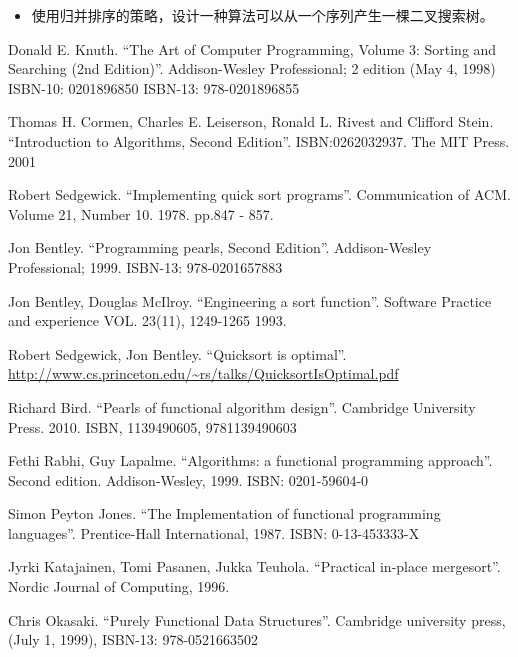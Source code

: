 \documentclass{ctexart}
\begin{document}
\begin{Exercise}
  \begin{itemize}
    \item 使用归并排序的策略，设计一种算法可以从一个序列产生一棵二叉搜索树。
  \end{itemize}
\end{Exercise}

\ifx\wholebook\relax\else

\begin{thebibliography}{99}

Donald E. Knuth. ``The Art of Computer Programming, Volume 3: Sorting and Searching (2nd Edition)''. Addison-Wesley Professional; 2 edition (May 4, 1998) ISBN-10: 0201896850 ISBN-13: 978-0201896855

Thomas H. Cormen, Charles E. Leiserson, Ronald L. Rivest and Clifford Stein.
``Introduction to Algorithms, Second Edition''. ISBN:0262032937. The MIT Press. 2001

Robert Sedgewick. ``Implementing quick sort programs''. Communication of ACM. Volume 21, Number 10. 1978. pp.847 - 857.

Jon Bentley. ``Programming pearls, Second Edition''. Addison-Wesley Professional; 1999. ISBN-13: 978-0201657883

Jon Bentley, Douglas McIlroy. ``Engineering a sort function''. Software Practice and experience VOL. 23(11), 1249-1265 1993.

Robert Sedgewick, Jon Bentley. ``Quicksort is optimal''. \url{http://www.cs.princeton.edu/~rs/talks/QuicksortIsOptimal.pdf}

Richard Bird. ``Pearls of functional algorithm design''. Cambridge University Press. 2010. ISBN, 1139490605, 9781139490603

Fethi Rabhi, Guy Lapalme. ``Algorithms: a functional programming approach''. Second edition. Addison-Wesley, 1999. ISBN: 0201-59604-0

Simon Peyton Jones. ``The Implementation of functional programming languages''. Prentice-Hall International, 1987. ISBN: 0-13-453333-X

Jyrki Katajainen, Tomi Pasanen, Jukka Teuhola. ``Practical in-place mergesort''. Nordic Journal of Computing, 1996.

Chris Okasaki. ``Purely Functional Data Structures''. Cambridge university press, (July 1, 1999), ISBN-13: 978-0521663502


\end{thebibliography}
\end{document}
